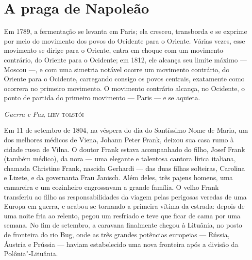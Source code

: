 \chapter{A praga de Napoleão}

\epigraph{Em 1789, a fermentação se levanta em Paris; ela cresceu, transborda e se
exprime por meio do movimento dos povos do Ocidente para o Oriente.
Várias vezes, esse movimento se dirige para o Oriente, entra em choque
com um movimento contrário, do Oriente para o Ocidente; em 1812, ele
alcança seu limite máximo --- Moscou ---, e com uma simetria notável ocorre
um movimento contrário, do Oriente para o Ocidente, carregando consigo
os povos centrais, exatamente como ocorrera no primeiro movimento. O
movimento contrário alcança, no Ocidente, o ponto de partida do primeiro
movimento --- Paris --- e se aquieta.}{\textit{Guerra e Paz}, \textsc{liev tolstói}\footnotemark}


Em 11 de setembro de 1804, na véspera do dia do Santíssimo Nome de
Maria, um dos melhores médicos de Viena, 
Johann Peter Frank, deixou sua
casa rumo à cidade russa de Vilna. O doutor Frank estava acompanhado do
filho, Josef Frank (também médico), da nora --- uma 
elegante e talentosa cantora lírica italiana, chamada Christine Frank,
nascida Gerhardi --- das
duas filhas solteiras, Carolina e Lizete, e da governanta Frau Janisch.
Além deles, três pajens homens, uma camareira e um cozinheiro
engrossavam a grande família. O velho Frank transferiu ao filho as
responsabilidades da viagem pelas perigosas veredas de uma Europa em
guerra, e acabou se tornando a primeira vítima da estrada: depois de uma
noite fria ao relento, pegou um resfriado e teve que ficar de cama por
uma semana. No fim de setembro, a caravana finalmente chegou à Lituânia,
no posto de fronteira do rio Bug, onde as três grandes potências
europeias --- Rússia, Áustria e Prússia --- haviam estabelecido uma nova
fronteira após a divisão da Polônia"-Lituânia.

